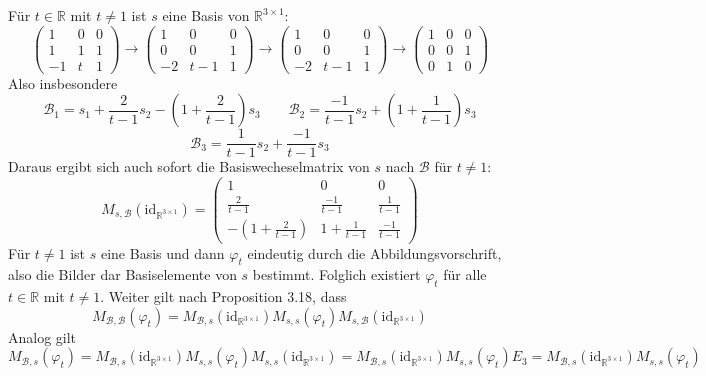 \documentclass[a4paper,graphics,11pt]{article}
\begin{document}
Für $t \in \mathbb{R}$ mit $t\neq 1$ ist $s$ eine Basis von $\mathbb{R}^{3\times 1}$:
$$
    \begin{pmatrix}
        1 & 0 & 0\\
        1 & 1 & 1\\
        -1 & t & 1
    \end{pmatrix}
    \to
    \begin{pmatrix}
        1 & 0 & 0\\
        0 & 0 & 1\\
        -2 & t-1 & 1
    \end{pmatrix}
    \to
    \begin{pmatrix}
        1 & 0 & 0\\
        0 & 0 & 1\\
        -2 & t-1 & 1
    \end{pmatrix}
    \to
    \begin{pmatrix}
        1 & 0 & 0\\
        0 & 0 & 1\\
        0 & 1 & 0
    \end{pmatrix}
$$
Also insbesondere
$$
    \mathcal{B}_1 = s_1 + \frac{2}{t-1} s_2 -(1 + \frac{2}{t-1})s_3
    \qquad
    \mathcal{B}_2 = \frac{-1}{t-1} s_2 + (1+\frac{1}{t-1})s_3
$$$$
    \mathcal{B}_3 = \frac{1}{t-1} s_2 + \frac{-1}{t-1}s_3
$$
Daraus ergibt sich auch sofort die Basiswecheselmatrix von $s$ nach $\mathcal{B}$ für $t\neq 1$:
$$
    M_{s,\mathcal{B}}(\text{id}_{\mathbb{R}^{3\times 1}}) =
    \begin{pmatrix}
        1 & 0 & 0\\[5pt]
        \frac{2}{t-1} & \frac{-1}{t-1} & \frac{1}{t-1}\\[5pt]
        -(1+\frac{2}{t-1}) & 1+\frac{1}{t-1} & \frac{-1}{t-1}
    \end{pmatrix}
$$
Für $t\neq 1$ ist $s$ eine Basis und dann $\varphi_t$ eindeutig durch die Abbildungsvorschrift,
also die Bilder dar Basiselemente von $s$ bestimmt. Folglich existiert $\varphi_t$ für
alle $t \in \mathbb{R}$ mit $t \neq 1$. Weiter gilt nach Proposition 3.18, dass
$$
    M_{\mathcal{B}, \mathcal{B}}(\varphi_t)
    = M_{\mathcal{B}, s}(\text{id}_{\mathbb{R}^{3\times 1}})
        M_{s,s}(\varphi_t)
        M_{s, \mathcal{B}}(\text{id}_{\mathbb{R}^{3\times 1}})
$$
Analog gilt
$$
    M_{\mathcal{B},s}(\varphi_t)
    = M_{\mathcal{B}, s}(\text{id}_{\mathbb{R}^{3\times 1}})
        M_{s,s}(\varphi_t)
        M_{s,s}(\text{id}_{\mathbb{R}^{3\times 1}})
    =  M_{\mathcal{B}, s}(\text{id}_{\mathbb{R}^{3\times 1}})
        M_{s,s}(\varphi_t)
        E_3
    = M_{\mathcal{B}, s}(\text{id}_{\mathbb{R}^{3\times 1}})
        M_{s,s}(\varphi_t)
$$
\end{document}
